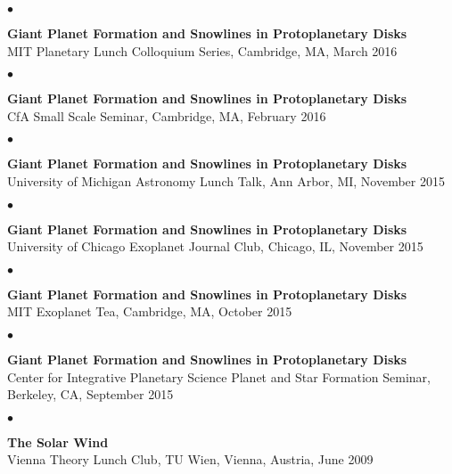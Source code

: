 \documentclass[margin,line]{res}
\newenvironment{list2}{
  \begin{list}{$\bullet$}{%
      \setlength{\itemsep}{0in}
      \setlength{\parsep}{0in} \setlength{\parskip}{0in}
      \setlength{\topsep}{0in} \setlength{\partopsep}{0in} 
      \setlength{\leftmargin}{0.2in}}}{\end{list}}
\begin{document}
\begin{resume}
\begin{list2}
\item[] {\bf Giant Planet Formation and Snowlines in Protoplanetary Disks} \\
MIT Planetary Lunch Colloquium Series, Cambridge, MA, March 2016\\
\end{list2}

\begin{list2}
\item[] {\bf Giant Planet Formation and Snowlines in Protoplanetary Disks} \\
CfA Small Scale Seminar, Cambridge, MA, February 2016\\
\end{list2}

\begin{list2}
\item[] {\bf Giant Planet Formation and Snowlines in Protoplanetary Disks} \\
University of Michigan Astronomy Lunch Talk, Ann Arbor, MI, November 2015 \\
\end{list2}

\begin{list2}
\item[] {\bf Giant Planet Formation and Snowlines in Protoplanetary Disks} \\
University of Chicago Exoplanet Journal Club, Chicago, IL, November 2015 \\
\end{list2}

\begin{list2}
\item[] {\bf Giant Planet Formation and Snowlines in Protoplanetary Disks} \\
MIT Exoplanet Tea, Cambridge, MA, October 2015 \\
\end{list2}

\begin{list2}
\item[] {\bf Giant Planet Formation and Snowlines in Protoplanetary Disks} \\
Center for Integrative Planetary Science Planet and Star Formation Seminar, Berkeley, CA, September 2015 \\
\end{list2}

\vspace*{-.13in}
\begin{list2}
\item[] {\bf The Solar Wind}\\ 
Vienna Theory Lunch Club, TU Wien, Vienna, Austria, June 2009  \\
\end{list2}


\end{resume}
\end{document}
